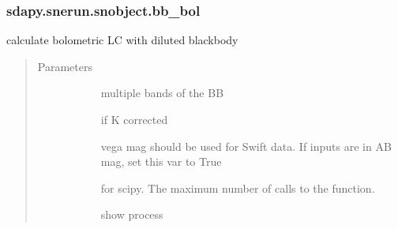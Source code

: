 \documentclass[letterpaper,10pt,english]{sphinxmanual}
\begin{document}
\begin{fulllineitems}
\begin{fulllineitems}
\begin{quote}
\begin{description}
\begin{description}
\end{description}

\end{description}\end{quote}

\end{fulllineitems}



\subsubsection{sdapy.snerun.snobject.bb\_bol}
\label{\detokenize{generated/sdapy.snerun.snobject.bb_bol:sdapy-snerun-snobject-bb-bol}}\label{\detokenize{generated/sdapy.snerun.snobject.bb_bol::doc}}

\begin{fulllineitems}
\label{\detokenize{generated/sdapy.snerun.snobject.bb_bol:sdapy.snerun.snobject.bb_bol}}
calculate bolometric LC with diluted blackbody
\begin{quote}\begin{description}
\item[{Parameters}] \leavevmode\begin{description}
\item[{}] \leavevmode{[}\sphinxtitleref{list}{]}
multiple bands of the BB

\item[{}] \leavevmode{[}\sphinxtitleref{bol}{]}
if K corrected

\item[{}] \leavevmode{[}\sphinxtitleref{bol}{]}
vega mag should be used for Swift data. If inputs are in AB mag, set this var to True

\item[{}] \leavevmode{[}\sphinxtitleref{int}{]}
for scipy. The maximum number of calls to the function.

\item[{}] \leavevmode{[}\sphinxtitleref{bol}{]}
show process

\end{description}


\end{description}
\end{quote}
\end{fulllineitems}
\end{fulllineitems}
\end{document}
